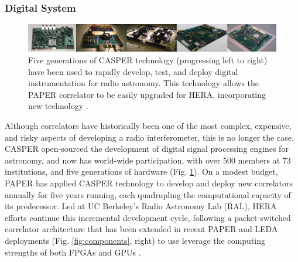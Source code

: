 \documentclass[preprint]{aastex}
\newcommand{\Mycitep}[1]{{\bf \citep{#1}}}
\newcommand{\compress}{\vspace{-0.25in}}
\newcommand{\Caption}[4]{\vspace{#1}\renewcommand{\baselinestretch}{#2}\caption{#4}\vspace{#3}}
\begin{document}
%



\compress
\subsubsection{Digital System}
\label{sec:digital}

\begin{figure}[t]\centering
\includegraphics[width=6.5in]{plots/casper_boards.jpg}
\Caption{-0.3in}{0.99}{-0.15in}{\small
Five generations of CASPER technology (progressing left to right) have been used to rapidly
develop, test, and deploy digital instrumentation for radio astronomy.  This technology
allows the PAPER correlator to be 
easily upgraded for HERA, incorporating new technology
\Mycitep{parsons_et_al2006,parsons_et_al2008}.
}\label{fig:casper_boards}
\end{figure}

Although correlators have historically been one of the most complex,
expensive, and risky aspects of developing a radio interferometer, this is no longer the case.
CASPER \Mycitep{parsons_et_al2006}
open-sourced the development of digital signal processing engines for astronomy, and
now has world-wide participation,
with over 500 members at 73 institutions, and 
five generations of hardware (Fig. \ref{fig:casper_boards}). 
On a modest budget, PAPER has applied CASPER technology to develop and deploy new correlators
annually for five years running, each quadrupling the computational capacity of its predecessor.
Led at UC Berkeley's Radio Astronomy Lab (RAL),
HERA efforts continue this incremental development cycle, following a packet-switched
correlator architecture \Mycitep{parsons_et_al2008} that has been
extended in recent PAPER and LEDA deployments (Fig. \ref{fig:components}, right)
to use leverage the computing strengths of both FPGAs and GPUs \citep{clark_et_al2011}.
\end{document}

